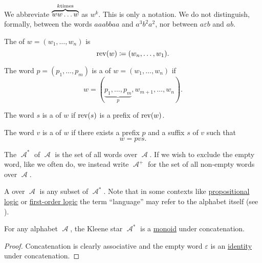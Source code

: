 \begin{definition}
\begin{thmenum}
    We abbreviate \( \overbrace{w w \ldots w}^{k \T{times}} \) as \( w^k \). This is only a notation. We do not distinguish, formally, between the words \( aaabbaa \) and \( a^3 b^2 a^2 \), nor between \( a \varepsilon b \) and \( ab \).

     The  of \( w = (w_1, \ldots, w_n) \) is
    \begin{equation*}
      \operatorname{rev}(w) \coloneqq (w_n, \ldots, w_1).
    \end{equation*}

     The word \( p = (p_1, \ldots, p_m) \) is a  of \( w = (w_1, \ldots, w_n) \) if
    \begin{equation*}
      w = (\underbrace{p_1, \ldots, p_m}_p, w_{m+1}, \ldots, w_n).
    \end{equation*}

     The word \( s \) is a  of \( w \) if \( \operatorname{rev}(s) \) is a prefix of \( \operatorname{rev}(w) \).

     The word \( v \) is a  of \( w \) if there exists a prefix \( p \) and a suffix \( s \) of \( v \) such that
    \begin{equation*}
      w = pvs.
    \end{equation*}

     The  \( \mscrA^* \) of \( \mscrA \) is the set of all words over \( \mscrA \). If we wish to exclude the empty word, like we often do, we instead write \( \mscrA^+ \) for the set of all non-empty words over \( \mscrA \).

     A  over \( \mscrA \) is any subset of \( \mscrA^* \). Note that in some contexts like \hyperref[subsec:propositional_logic]{propositional logic} or \hyperref[subsec:first_order_logic]{first-order logic} the term \enquote{language} may refer to the alphabet itself (see ).
  \end{thmenum}
\end{definition}

\begin{proposition}\label{thm:kleene_star_is_monoid}
  For any alphabet \( \mscrA \), the Kleene star \( \mscrA^* \) is a \hyperref[def:monoid]{monoid} under concatenation.
\end{proposition}
\begin{proof}
  Concatenation is clearly associative and the empty word \( \varepsilon \) is an \hyperref[def:monoid]{identity} under concatenation.
\end{proof}


